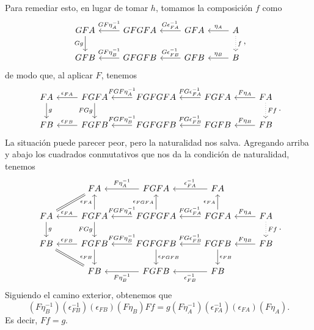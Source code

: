 \begin{sol}
\begin{itemize}
        Para remediar esto, en lugar de tomar $h$, tomamos la composición
        $f$ como
        \[
        \begin{tikzcd}
            GFA \ar[d,"Gg"']
            & GFGFA \ar[l,"GF\eta_A^{-1}"']
            & GFA \ar[l,"G\epsilon_{FA}^{-1}"']
            & A \ar[l,"\eta_A"']
            \ar[d,"f",dotted]\\
            GFB
            & GFGFB \ar[l,"GF\eta_B^{-1}"']
            & GFB \ar[l,"G\epsilon_{FB}^{-1}"']
            & B \ar[l,"\eta_B"']
        \end{tikzcd}
        ,\]
        de modo que, al aplicar $F$, tenemos
        \[
        \begin{tikzcd}
            FA \ar[d,"g"]
            & FGFA \ar[d,"FGg"'] \ar[l,"\epsilon_{FA}"']
            & FGFGFA \ar[l,"FGF\eta_A^{-1}"']
            & FGFA \ar[l,"FG\epsilon_{FA}^{-1}"']
            & FA \ar[l,"F\eta_A"']
            \ar[d,"Ff",dotted]\\
            FB
            & FGFB \ar[l,"\epsilon_{FB}"']
            & FGFGFB \ar[l,"FGF\eta_B^{-1}"']
            & FGFB \ar[l,"FG\epsilon_{FB}^{-1}"']
            & FB \ar[l,"F\eta_B"']
        \end{tikzcd}
        .\]
        La situación puede parecer peor, pero la naturalidad nos salva.
        Agregando arriba y abajo los cuadrados conmutativos que nos
        da la condición de naturalidad, tenemos
        \[
        \begin{tikzcd}
            & FA \ar[equal,dl]
            & FGFA \ar[l,"F\eta_A^{-1}"']
            & FA \ar[l,"\epsilon_{FA}^{-1}"']
            \\
            FA \ar[d,"g"]
            & FGFA \ar[d,"FGg"'] \ar[u,"\epsilon_{FA}"]\ar[l,"\epsilon_{FA}"']
            & FGFGFA \ar[l,"FGF\eta_A^{-1}"'] \ar[u,"\epsilon_{FGFA}"]
            & FGFA \ar[l,"FG\epsilon_{FA}^{-1}"'] \ar[u,"\epsilon_{FA}"]
            & FA \ar[l,"F\eta_A"']
            \ar[d,"Ff",dotted]
            \\
            FB
            & FGFB \ar[l,"\epsilon_{FB}"']\ar[d,"\epsilon_{FB}"']
            & FGFGFB \ar[l,"FGF\eta_B^{-1}"'] \ar[d,"\epsilon_{FGFB}"]
            & FGFB \ar[l,"FG\epsilon_{FB}^{-1}"'] \ar[d,"\epsilon_{FB}"]
            & FB \ar[l,"F\eta_B"']
            \\
            & FB \ar[equal,ul]
            & FGFB \ar[l,"F\eta_B^{-1}"]
            & FB \ar[l,"\epsilon_{FB}^{-1}"]
        \end{tikzcd}
        .\]
        Siguiendo el camino exterior, obtenemos que
        \[
            (F\eta_B^{-1})(\epsilon_{FB}^{-1})(\epsilon_{FB})(F\eta_B)Ff
            = g(F\eta_A^{-1})(\epsilon_{FA}^{-1})(\epsilon_{FA})(F\eta_A)
        .\]
        Es decir, $Ff=g$.
        

\end{itemize}
\end{sol}
